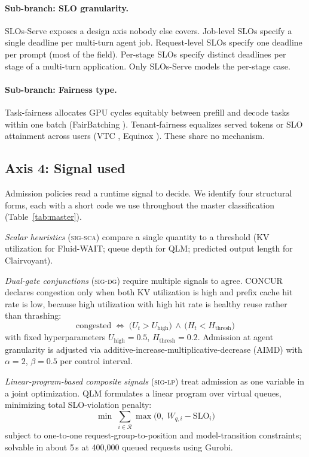 \documentclass[10pt]{article} %
\theoremstyle{definition}
\begin{document}
\paragraph{Sub-branch: SLO granularity.}
SLOs-Serve \citep{chen2025slosserve} exposes a design axis nobody else
covers. Job-level SLOs specify a single deadline per multi-turn agent
job. Request-level SLOs specify one deadline per prompt (most of the
field). Per-stage SLOs specify distinct deadlines per stage of a
multi-turn application. Only SLOs-Serve models the per-stage case.

\paragraph{Sub-branch: Fairness type.}
Task-fairness allocates GPU cycles equitably between prefill and
decode tasks within one batch (FairBatching
\citep{lyu2025fairbatching}). Tenant-fairness equalizes served tokens
or SLO attainment across users (VTC \citep{sheng2024vtc}, Equinox
\citep{lu2025equinox}). These share no mechanism.

\subsection{Axis 4: Signal used}

Admission policies read a runtime signal to decide. We identify four
structural forms, each with a short code we use throughout the master
classification (Table~\ref{tab:master}).

\textit{Scalar heuristics} (\textsc{sig-sca}) compare a single quantity
to a threshold (KV utilization for Fluid-WAIT; queue depth for QLM;
predicted output length for Clairvoyant).

\textit{Dual-gate conjunctions} (\textsc{sig-dg}) require multiple
signals to agree.
CONCUR declares congestion only when both KV utilization is high and
prefix cache hit rate is low, because high utilization with high hit
rate is healthy reuse rather than thrashing:
%
\begin{equation}
\text{congested} \;\iff\; \bigl(U_t > U_{\text{high}}\bigr) \,\wedge\, \bigl(H_t < H_{\text{thresh}}\bigr)
\label{eq:concur-dualgate}
\end{equation}
%
with fixed hyperparameters $U_{\text{high}} = 0.5$,
$H_{\text{thresh}} = 0.2$. Admission at agent granularity is adjusted
via additive-increase-multiplicative-decrease (AIMD) with $\alpha = 2$,
$\beta = 0.5$ per control interval.

\textit{Linear-program-based composite signals} (\textsc{sig-lp}) treat
admission as one variable in a joint optimization. QLM formulates a linear program over
virtual queues, minimizing total SLO-violation penalty:
%
\begin{equation}
\min \; \sum_{i \in \mathcal{R}} \max\bigl(0,\; W_{q,i} - \mathrm{SLO}_i\bigr)
\label{eq:qlm-lp}
\end{equation}
%
subject to one-to-one request-group-to-position and model-transition
constraints; solvable in about 5\,s at 400{,}000 queued requests using
Gurobi.
\end{document}
